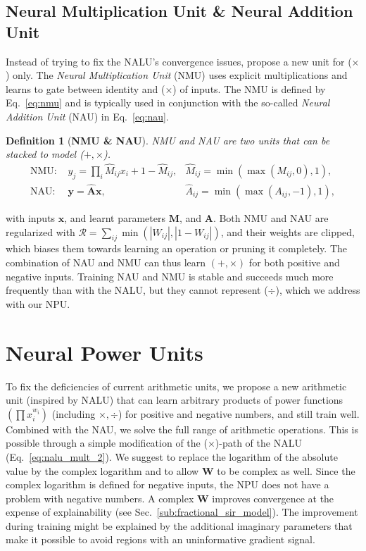 \documentclass[9pt]{article}
\newtheorem*{definition}{Definition}
\begin{document}
\subsection{Neural Multiplication Unit \& Neural Addition Unit}%
\label{sub:neural_multiplication_unit}

Instead of trying to fix the NALU's convergence issues,
\cite{madsen_neural_2020} propose a new unit for ($\times$) only.
The \emph{Neural Multiplication Unit} (NMU) uses explicit multiplications and learns
to gate between identity and ($\times$) of inputs. The NMU is
defined by Eq.~\ref{eq:nmu} and is typically used in conjunction with the
so-called \emph{Neural Addition Unit} (NAU) in Eq.~\ref{eq:nau}.
\begin{definition}[{\bf NMU \& NAU}]
  NMU and NAU are two units that can be stacked to model ($+,\times$).
\begin{align}
  \label{eq:nmu}
  \text{NMU: } &y_j = \prod_i \hat M_{ij} x_{i} + 1 - \hat M_{ij}, & \hat M_{ij}=\min(\max(M_{ij}, 0), 1),\\
  \label{eq:nau}
  \text{NAU: } &\bm y = \bm{\hat{A}} \bm x, & \hat A_{ij}=\min(\max(A_{ij}, -1), 1),
\end{align}
\end{definition}
with inputs $\bm x$, and learnt parameters $\bm M$, and $\bm A$.
Both NMU and NAU are regularized with $\mathcal{R} = \sum_{ij} \min(|W_{ij}|,
|1-W_{ij}|)$, and their weights are clipped, which biases them towards learning
an operation or pruning it completely.  The combination of NAU and NMU can thus
learn $(+,\times)$ for both positive and negative inputs. Training NAU and NMU
is stable and succeeds much more frequently than with the NALU, but they cannot
represent ($\div$), which we address with our NPU.


\section{Neural Power Units}%
\label{sec:neural_power_unit}

To fix the deficiencies of current arithmetic units, we propose a new
arithmetic unit (inspired by NALU) that can learn arbitrary products of power functions $(\prod x_{i}^{w_i})$ (including
$\times,\div$) for positive and negative numbers, and still train well.
Combined with the NAU, we solve the full range of arithmetic operations.
This is possible through a simple modification of the ($\times$)-path of the
NALU (Eq.~\ref{eq:nalu_mult_2}). 
We suggest to replace the logarithm of the absolute value by the complex logarithm and
to allow $\bm W$ to be complex as well. Since the complex logarithm is defined for
negative inputs, the NPU does not have a problem with negative numbers. A complex $\bm W$ 
improves convergence at the expense of explainability (see
Sec.~\ref{sub:fractional_sir_model}). The improvement during training might be
explained by the additional imaginary parameters that make it possible to avoid
regions with an uninformative gradient signal.
\end{document}
